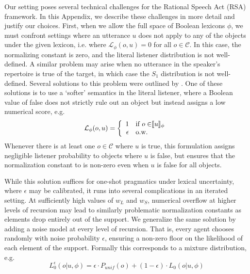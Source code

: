 \documentclass[11pt, floatsintext]{apa6}
\newcommand{\den}[1]{\ensuremath{\llbracket #1 \rrbracket}}
\begin{document}
Our setting poses several technical challenges for the Rational Speech Act (RSA) framework.
In this Appendix, we describe these challenges in more detail and justify our choices.
First, when we allow the full space of Boolean lexicons $\phi$, we must confront settings where an utterance $u$ does not apply to any of the objects under the given lexicon, i.e. where $\mathcal{L}_\phi(o, u) = 0$ for all $o\in \mathcal{C}$. 
In this case, the normalizing constant is zero, and the literal listener distribution is not well-defined.
A similar problem may arise when no utterance in the speaker's repertoire is true of the target, in which case the $S_1$ distribution is not well-defined.
Several solutions to this problem were outlined by .
One of these solutions is to use a `softer' semantics in the literal listener, where a Boolean value of false does not strictly rule out an object but instead assigns a low numerical score, e.g. 
$$\mathcal{L}_\phi(o,u) = \left\{ \begin{array} {rl} 1 & \textrm{if $o \in $\den{u}$_\phi$} \\ \epsilon & \textrm{o.w.} \end{array}\right.$$
Whenever there is at least one $o\in\mathcal{C}$ where $u$ is true, this formulation assigns negligible listener probability to objects where $u$ is false, but ensures that the normalization constant to is non-zero even when $u$ is false for all objects.

While this solution suffices for one-shot pragmatics under lexical uncertainty, where $\epsilon$ may be calibrated, it runs into several complications in an iterated setting.
At sufficiently high values of $w_L$ and $w_S$, numerical overflow at higher levels of recursion may lead to similarly problematic normalization constants as elements drop entirely out of the support.
We generalize the same solution by adding a noise model at every level of recursion.
That is, every agent chooses randomly with noise probability $\epsilon$, ensuring a non-zero floor on the likelihood of each element of the support.
Formally this corresponds to a mixture distribution, e.g. 
$$L_0^{\epsilon}(o|u,\phi) = \epsilon \cdot P_{unif}(o) + (1-\epsilon) \cdot L_0(o|u,\phi)$$

\end{document}
